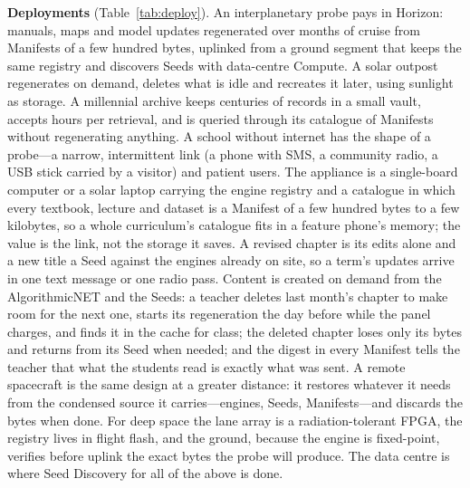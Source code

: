 \documentclass[11pt,a4paper]{article}
\theoremstyle{definition}
\theoremstyle{plain}
\theoremstyle{remark}
\newcommand{\anet}{AlgorithmicNET}
\begin{document}
\textbf{Deployments} (Table~\ref{tab:deploy}). An interplanetary probe pays in Horizon:
manuals, maps and model updates regenerated over months of cruise from Manifests of a few
hundred bytes, uplinked from a ground segment that keeps the same registry and discovers Seeds
with data-centre Compute. A solar outpost regenerates on demand, deletes what is idle and recreates
it later, using sunlight as storage. A millennial archive keeps centuries of records in a small
vault, accepts hours per retrieval, and is queried through its catalogue of Manifests without
regenerating anything. A school without internet has the shape of a probe---a narrow, intermittent link (a phone with
SMS, a community radio, a USB stick carried by a visitor) and patient users. The appliance is a
single-board computer or a solar laptop carrying the engine registry and a catalogue in which
every textbook, lecture and dataset is a Manifest of a few hundred bytes to a few kilobytes, so a
whole curriculum's catalogue fits in a feature phone's memory; the value is the link, not the
storage it saves. A revised chapter is its edits alone and a new title a Seed against the engines
already on site, so a term's updates arrive in one text message or one radio pass. Content is
created on demand from the \anet{} and the Seeds: a teacher deletes last month's chapter to make
room for the next one, starts its regeneration the day before while the panel charges, and finds
it in the cache for class; the deleted chapter loses only its bytes and returns from its Seed when
needed; and the digest in every Manifest tells the teacher that what the students read is exactly
what was sent. A remote spacecraft is the same design at a greater distance: it restores whatever
it needs from the condensed source it carries---engines, Seeds, Manifests---and discards the bytes
when done. For
deep space the lane array is a radiation-tolerant FPGA, the registry lives in flight flash, and
the ground, because the engine is fixed-point, verifies before uplink the exact bytes the probe
will produce. The data centre is where Seed Discovery for all of the above is done.
\end{document}
